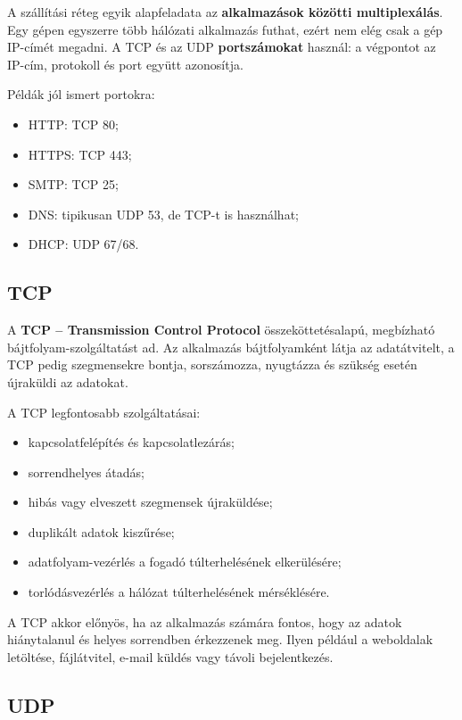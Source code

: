 A szállítási réteg egyik alapfeladata az \textbf{alkalmazások közötti multiplexálás}. Egy gépen egyszerre több hálózati alkalmazás futhat, ezért nem elég csak a gép IP-címét megadni. A TCP és az UDP \textbf{portszámokat} használ: a végpontot az IP-cím, protokoll és port együtt azonosítja.

Példák jól ismert portokra:

\begin{itemize}
  \item HTTP: TCP 80;
  \item HTTPS: TCP 443;
  \item SMTP: TCP 25;
  \item DNS: tipikusan UDP 53, de TCP-t is használhat;
  \item DHCP: UDP 67/68.
\end{itemize}

\subsection{TCP}

A \textbf{TCP -- Transmission Control Protocol} összeköttetésalapú, megbízható bájtfolyam-szolgáltatást ad. Az alkalmazás bájtfolyamként látja az adatátvitelt, a TCP pedig szegmensekre bontja, sorszámozza, nyugtázza és szükség esetén újraküldi az adatokat.

A TCP legfontosabb szolgáltatásai:

\begin{itemize}
  \item kapcsolatfelépítés és kapcsolatlezárás;
  \item sorrendhelyes átadás;
  \item hibás vagy elveszett szegmensek újraküldése;
  \item duplikált adatok kiszűrése;
  \item adatfolyam-vezérlés a fogadó túlterhelésének elkerülésére;
  \item torlódásvezérlés a hálózat túlterhelésének mérséklésére.
\end{itemize}

A TCP akkor előnyös, ha az alkalmazás számára fontos, hogy az adatok hiánytalanul és helyes sorrendben érkezzenek meg. Ilyen például a weboldalak letöltése, fájlátvitel, e-mail küldés vagy távoli bejelentkezés.

\subsection{UDP}

